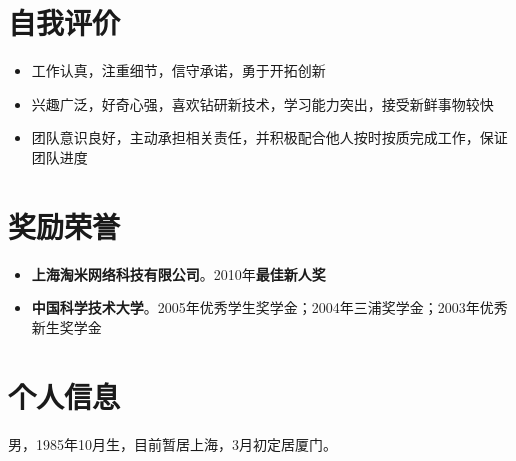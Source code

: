 \documentclass[margin]{res}
\newcommand{\ustc}{中国科学技术大学}
\newcommand{\taomee}{上海淘米网络科技有限公司}
\begin{document}
\section{\Large 自我评价}
\begin{itemize}
    \item 工作认真，注重细节，信守承诺，勇于开拓创新
    \item 兴趣广泛，好奇心强，喜欢钻研新技术，学习能力突出，接受新鲜事物较快
    \item 团队意识良好，主动承担相关责任，并积极配合他人按时按质完成工作，保证团队进度 
\end{itemize}


\section{\Large 奖励荣誉} 
\begin{itemize}
    \item {\bf \taomee}。2010年{\bf 最佳新人奖}
    \item {\bf \ustc}。2005年优秀学生奖学金；2004年三浦奖学金；2003年优秀新生奖学金
\end{itemize}

\section{\Large 个人信息}
    男，1985年10月生，目前暂居上海，3月初定居厦门。
\end{document}
